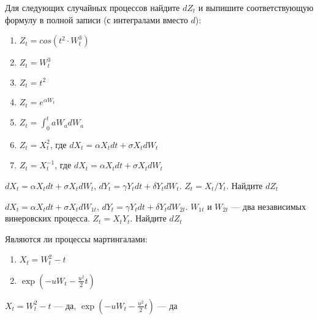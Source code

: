 \begin{problem}
Для следующих случайных процессов найдите $dZ_{t}$ и выпишите соответствующую формулу в полной записи (с интегралами вместо $d$):
\begin{enumerate}
\item $Z_{t}=cos(t^{2}\cdot W_{t}^{3})$
\item $Z_{t}=W^{3}_{t}$ \\
\item $Z_{t}=t^{2}$ \\
\item $Z_{t}=e^{\alpha W_{t}}$ \\
\item $Z_{t}=\int_{0}^{t} aW_{a}dW_{a}$ \\
\item $Z_{t}=X^{2}_{t}$, где $dX_{t}=\alpha X_{t}dt+\sigma X_{t}dW_{t}$ \\
\item $Z_{t}=X^{-1}_{t}$, где $dX_{t}=\alpha X_{t}dt+\sigma X_{t}dW_{t}$
\end{enumerate}

\begin{sol}

\end{sol}
\end{problem}

\begin{problem}
 $dX_{t}=\alpha X_{t}dt+\sigma X_{t}dW_{t}$, $dY_{t}=\gamma Y_{t}dt+\delta Y_{t}dW_{t}$. $Z_{t}=X_{t}/Y_{t}$. Найдите $dZ_{t}$

\begin{sol}

\end{sol}
\end{problem}

\begin{problem}
 $dX_{t}=\alpha X_{t}dt+\sigma X_{t}dW_{1t}$, $dY_{t}=\gamma Y_{t}dt+\delta Y_{t}dW_{2t}$. $W_{1t}$ и $W_{2t}$ — два независимых винеровских процесса. $Z_{t}=X_{t}Y_{t}$. Найдите $dZ_{t}$

\begin{sol}

\end{sol}
\end{problem}

\begin{problem}
Являются ли процессы мартингалами:
\begin{enumerate}
\item $X_{t}=W_{t}^{2}-t$
\item  $\exp(-uW_{t}-\frac{u^{2}}{2}t)$
\end{enumerate}


\begin{sol}
$X_{t}=W_{t}^{2}-t$ — да, $\exp(-uW_{t}-\frac{u^{2}}{2}t)$ — да
\end{sol}
\end{problem}

